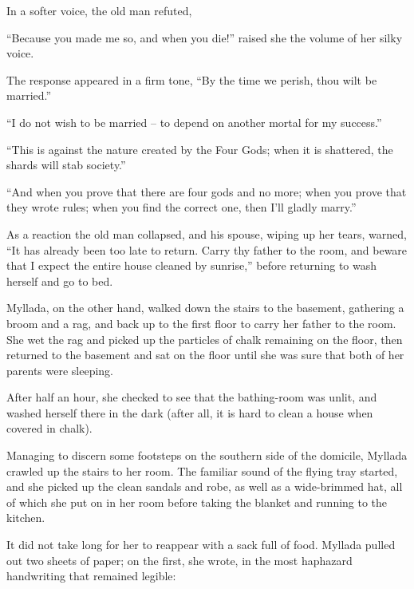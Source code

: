 In a softer voice, the old man refuted,


``Because you made me so, and when you die!'' raised she the volume of her silky voice.

The response appeared in a firm tone, ``By the time we perish, thou wilt be married.''

``I do not wish to be married -- to depend on another mortal for my success.''

``This is against the nature created by the Four Gods; when it is shattered, the shards will stab society.''

``And when you prove that there are four gods and no more; when you prove that they wrote rules; when you find the correct one, then I'll gladly marry.''

As a reaction the old man collapsed, and his spouse, wiping up her tears, warned, ``It has already been too late to return. Carry thy father to the room, and beware that I expect the entire house cleaned by sunrise,'' before returning to wash herself and go to bed.

Myllada, on the other hand, walked down the stairs to the basement, gathering a broom and a rag, and back up to the first floor to carry her father to the room. She wet the rag and picked up the particles of chalk remaining on the floor, then returned to the basement and sat on the floor until she was sure that both of her parents were sleeping.

After half an hour, she checked to see that the bathing-room was unlit, and washed herself there in the dark (after all, it is hard to clean a house when covered in chalk).

Managing to discern some footsteps on the southern side of the domicile, Myllada crawled up the stairs to her room. The familiar sound of the flying tray started, and she picked up the clean sandals and robe, as well as a wide-brimmed hat, all of which she put on in her room before taking the blanket and running to the kitchen.

It did not take long for her to reappear with a sack full of food. Myllada pulled out two sheets of paper; on the first, she wrote, in the most haphazard handwriting that remained legible:


